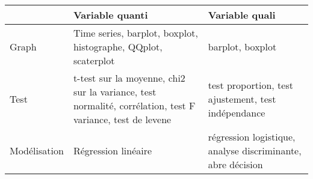 \documentclass[]{book}
\theoremstyle{definition}
\theoremstyle{definition}
\theoremstyle{definition}
\theoremstyle{remark}
\begin{document}
\begin{longtable}[]{@{}lll@{}}
\toprule
\begin{minipage}[b]{0.05\columnwidth}\raggedright\strut
\strut
\end{minipage} & \begin{minipage}[b]{0.22\columnwidth}\raggedright\strut
Variable quanti\strut
\end{minipage} & \begin{minipage}[b]{0.20\columnwidth}\raggedright\strut
Variable quali\strut
\end{minipage}\tabularnewline
\midrule
\endhead
\begin{minipage}[t]{0.05\columnwidth}\raggedright\strut
Graph\strut
\end{minipage} & \begin{minipage}[t]{0.22\columnwidth}\raggedright\strut
Time series, barplot, boxplot, histographe, QQplot, scaterplot\strut
\end{minipage} & \begin{minipage}[t]{0.20\columnwidth}\raggedright\strut
barplot, boxplot\strut
\end{minipage}\tabularnewline
\begin{minipage}[t]{0.05\columnwidth}\raggedright\strut
Test\strut
\end{minipage} & \begin{minipage}[t]{0.22\columnwidth}\raggedright\strut
t-test sur la moyenne, chi2 sur la variance, test normalité,
corrélation, test F variance, test de levene\strut
\end{minipage} & \begin{minipage}[t]{0.20\columnwidth}\raggedright\strut
test proportion, test ajustement, test indépendance\strut
\end{minipage}\tabularnewline
\begin{minipage}[t]{0.05\columnwidth}\raggedright\strut
Modélisation\strut
\end{minipage} & \begin{minipage}[t]{0.22\columnwidth}\raggedright\strut
Régression linéaire\strut
\end{minipage} & \begin{minipage}[t]{0.20\columnwidth}\raggedright\strut
régression logistique, analyse discriminante, abre décision\strut
\end{minipage}\tabularnewline
\bottomrule
\end{longtable}
\end{document}
